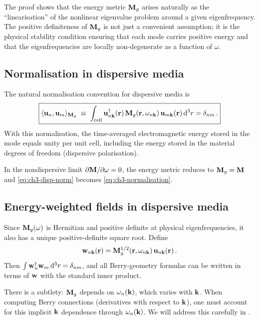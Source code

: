 \begin{remark}
The proof shows that the energy metric $\mathbf{M}_g$ arises naturally as the
``linearisation'' of the nonlinear eigenvalue problem around a given
eigenfrequency.  The positive definiteness of $\mathbf{M}_g$ is not just a
convenient assumption; it is the physical stability condition ensuring
that each mode carries positive energy and that the eigenfrequencies
are locally non-degenerate as a function of $\omega$.
\end{remark}

\subsection{Normalisation in dispersive media}
\label{sec:ch3-disp-norm}

The natural normalisation convention for dispersive media is
\begin{equation}\label{eq:ch3-disp-norm}
  \boxed{%
  \eip{\mathbf{u}_n}{\mathbf{u}_m}
  \;\equiv\;
  \int_{\mathrm{cell}}
  \mathbf{u}_{n\kvec}^\dagger(\rvec)\,
  \Mgmat(\rvec,\omega_{n\kvec})\,
  \mathbf{u}_{m\kvec}(\rvec)\,\dd^3r
  = \delta_{nm}\,.}
\end{equation}
With this normalisation, the time-averaged electromagnetic energy stored
in the mode equals unity per unit cell, including the energy stored in
the material degrees of freedom (dispersive polarisation).

In the nondispersive limit $\partial\mathbf{M}/\partial\omega=0$, the energy
metric reduces to $\mathbf{M}_g=\mathbf{M}$ and
\eqref{eq:ch3-disp-norm} becomes \eqref{eq:ch3-normalisation}.

\subsection{Energy-weighted fields in dispersive media}
\label{sec:ch3-disp-weighted}

Since $\mathbf{M}_g(\omega)$ is Hermitian and positive definite at physical
eigenfrequencies, it also has a unique positive-definite square root.
Define
\begin{equation}\label{eq:ch3-disp-w}
  \mathbf{w}_{n\mathbf{k}}(\mathbf{r})
  = \mathbf{M}_g^{1/2}(\mathbf{r},\omega_{n\mathbf{k}})\,\mathbf{u}_{n\mathbf{k}}(\mathbf{r})\,.
\end{equation}
Then $\int\mathbf{w}_n^\dagger\mathbf{w}_m\,\mathrm{d}^3r=\delta_{nm}$, and all
Berry-geometry formulas can be written in terms of $\mathbf{w}$ with the
standard inner product.

\begin{remark}
There is a subtlety: $\mathbf{M}_g$ depends on $\omega_n(\mathbf{k})$, which
varies with $\mathbf{k}$.  When computing Berry connections (derivatives
with respect to $\mathbf{k}$), one must account for this implicit $\mathbf{k}$
dependence through $\omega_n(\mathbf{k})$.  We will address this carefully in
.
\end{remark}


